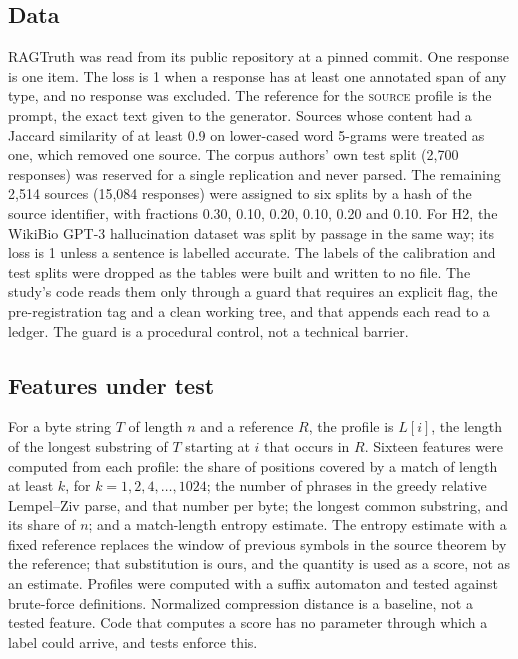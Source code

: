 \documentclass[11pt]{article}
\newcommand{\arm}[1]{\textsc{#1}}
\begin{document}
\subsection*{Data}
RAGTruth\cite{ragtruth} was read from its public repository at a pinned commit. One response is one item. The loss is 1 when a response has at least one annotated span of any type, and no response was excluded. The reference for the \arm{source} profile is the prompt, the exact text given to the generator. Sources whose content had a Jaccard similarity of at least 0.9 on lower-cased word 5-grams were treated as one, which removed one source. The corpus authors' own test split (2,700 responses) was reserved for a single replication and never parsed. The remaining 2,514 sources (15,084 responses) were assigned to six splits by a hash of the source identifier, with fractions 0.30, 0.10, 0.20, 0.10, 0.20 and 0.10. For H2, the WikiBio GPT-3 hallucination dataset\cite{selfcheck} was split by passage in the same way; its loss is 1 unless a sentence is labelled accurate. The labels of the calibration and test splits were dropped as the tables were built and written to no file. The study's code reads them only through a guard that requires an explicit flag, the pre-registration tag and a clean working tree, and that appends each read to a ledger. The guard is a procedural control, not a technical barrier.

\subsection*{Features under test}
For a byte string $T$ of length $n$ and a reference $R$, the profile is $L[i]$, the length of the longest substring of $T$ starting at $i$ that occurs in $R$. Sixteen features were computed from each profile: the share of positions covered by a match of length at least $k$, for $k = 1, 2, 4, \dots, 1024$; the number of phrases in the greedy relative Lempel--Ziv parse\cite{zivmerhav}, and that number per byte; the longest common substring, and its share of $n$; and a match-length entropy estimate\cite{kontoyiannis}. The entropy estimate with a fixed reference replaces the window of previous symbols in the source theorem by the reference; that substitution is ours, and the quantity is used as a score, not as an estimate. Profiles were computed with a suffix automaton\cite{blumer} and tested against brute-force definitions. Normalized compression distance\cite{ncd} is a baseline, not a tested feature. Code that computes a score has no parameter through which a label could arrive, and tests enforce this.
\end{document}

